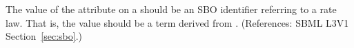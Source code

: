 The value of the  attribute on a \KineticLaw should be an SBO
identifier referring to a rate law.  That is, the value should be a term
derived from \sboratelaw.  (References: SBML L3V1 Section~\ref{sec:sbo}.)
